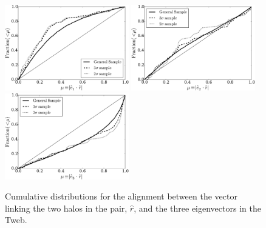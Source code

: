 \documentclass{emulateapj}
\begin{document}
\begin{figure}
\begin{center}
  \includegraphics[width=0.48\textwidth]{alignments_e1_r_all_environments.pdf} 
  \includegraphics[width=0.48\textwidth]{alignments_e2_r_all_environments.pdf} 
  \includegraphics[width=0.48\textwidth]{alignments_e3_r_all_environments.pdf} 
\end{center}
\caption{Cumulative distributions for the alignment between the vector
  linking the two halos in the pair, $\hat{r}$, and the three
  eigenvectors in the Tweb.
    \label{fig:alignment_r}}  
\end{figure}


\end{document}

